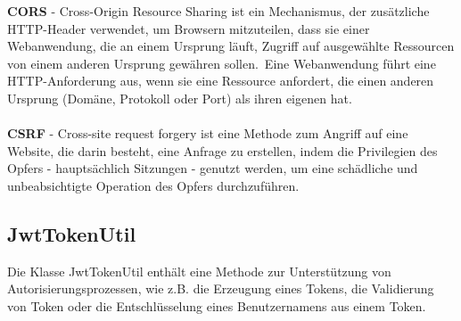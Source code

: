 \textbf{CORS} - Cross-Origin Resource Sharing ist ein Mechanismus, der zusätzliche HTTP-Header verwendet, um Browsern mitzuteilen, dass sie einer Webanwendung, die an einem Ursprung läuft, Zugriff auf ausgewählte Ressourcen von einem anderen Ursprung gewähren sollen. Eine Webanwendung führt eine HTTP-Anforderung aus, wenn sie eine Ressource anfordert, die einen anderen Ursprung (Domäne, Protokoll oder Port) als ihren eigenen hat.
\\ \\
\textbf{CSRF} - Cross-site request forgery ist eine Methode zum Angriff auf eine Website, die darin besteht, eine Anfrage zu erstellen, indem die Privilegien des Opfers - hauptsächlich Sitzungen - genutzt werden, um eine schädliche und unbeabsichtigte Operation des Opfers durchzuführen.

\subsection{JwtTokenUtil}
Die Klasse JwtTokenUtil enthält eine Methode zur Unterstützung von Autorisierungsprozessen, wie z.B. die Erzeugung eines Tokens, die Validierung von Token oder die Entschlüsselung eines Benutzernamens aus einem Token.
